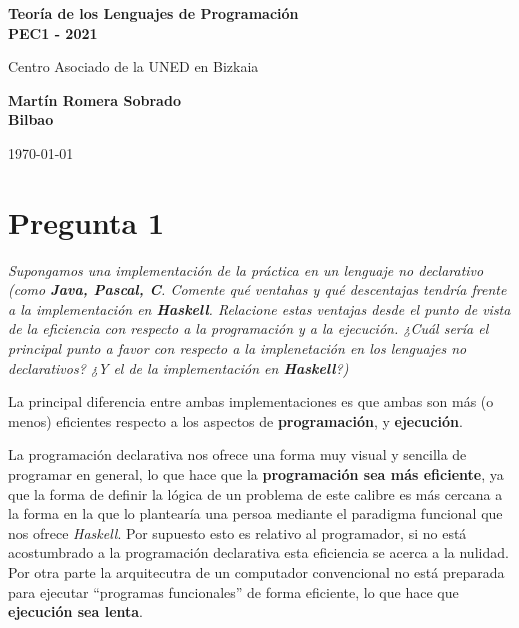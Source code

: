 \documentclass[a4paper, 12pt]{article}
\begin{document}
    \begin{titlepage}
        
        \centering
		\vspace*{1cm}
		
		\Huge
		\textbf{Teoría de los Lenguajes de Programación}\\
		\textbf{PEC1 - 2021}
		
		\vspace{0.5cm}
		\LARGE
		Centro Asociado de la UNED en Bizkaia\\
		\vspace{1.5cm}
		
		\textbf{Martín Romera Sobrado}\\
		\textbf{Bilbao}
		
		\vfill
		
		\vspace{0.8cm}
		\Large
		\today

    \end{titlepage}

	\tableofcontents
	\newpage

	\section{Pregunta 1}

        \textit{Supongamos una implementación de la práctica en un lenguaje no
        declarativo (como \textbf{Java, Pascal, C}. Comente qué ventahas y qué
        descentajas tendría frente a la implementación en \textbf{Haskell}. 
        Relacione estas ventajas desde el punto de vista de la eficiencia con 
        respecto a la programación y a la ejecución. ¿Cuál sería el principal
        punto a favor con respecto a la implenetación en los lenguajes no 
        declarativos? ¿Y el de la implementación en \textbf{Haskell}?)}\\\mbox{}

        La principal diferencia entre ambas implementaciones es que ambas son 
        más (o menos) eficientes respecto a los aspectos de \textbf{programación},
        y \textbf{ejecución}. \\\mbox{}
        
        La programación declarativa nos ofrece una forma 
        muy visual y sencilla de programar en general, lo que hace que la 
        \textbf{programación sea más eficiente}, ya que la forma de definir la 
        lógica de un problema de este calibre es más cercana a la forma en la 
        que lo plantearía una persoa mediante el paradigma funcional que nos 
        ofrece \textit{Haskell}. 
        Por supuesto esto es relativo al programador, si no está acostumbrado a la programación 
        declarativa esta eficiencia se acerca a la nulidad. Por otra parte la 
        arquitecutra de un computador convencional no está preparada para 
        ejecutar ``programas funcionales'' de forma eficiente, lo que hace que 
        \textbf{ejecución sea lenta}.\\\mbox{}
\end{document}
